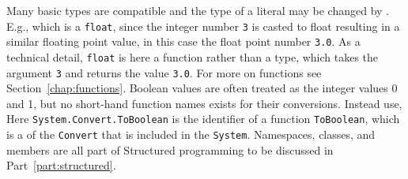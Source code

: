 Many basic types are compatible and the type of a literal may be changed by . E.g.,
%
which is a \lstinline!float!, since the integer number \lstinline|3| is casted to float resulting in a similar floating point value, in this case the float point number \lstinline|3.0|. As a technical detail, \lstinline|float| is here a function rather than a type, which takes the argument \lstinline|3| and returns the value \lstinline|3.0|.  For more on functions see Section~\ref{chap:functions}. Boolean values are often treated as the integer values 0 and 1, but no short-hand function names exists for their conversions. Instead use,
%
Here \lstinline|System.Convert.ToBoolean| is the identifier of a function \lstinline|ToBoolean|, which is a  of the  \lstinline|Convert| that is included in the  \lstinline|System|. Namespaces, classes, and members are all part of Structured programming to be discussed in Part~\ref{part:structured}.

